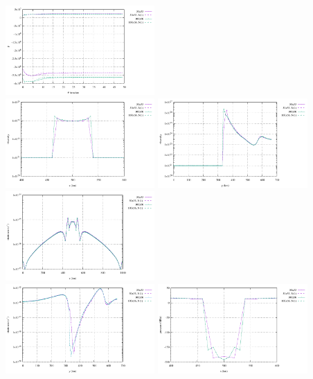 \begin{center}
\includegraphics[width=5.7cm]{python_codes/fieldstone_87/results/experiment_03/p}\\
\includegraphics[width=5.7cm]{python_codes/fieldstone_87/results/experiment_03/horizontal_profile_eta.pdf}
\includegraphics[width=5.7cm]{python_codes/fieldstone_87/results/experiment_03/vertical_profile_eta.pdf}
\includegraphics[width=5.7cm]{python_codes/fieldstone_87/results/experiment_03/horizontal_profile_srn.pdf}\\
\includegraphics[width=5.7cm]{python_codes/fieldstone_87/results/experiment_03/vertical_profile_srn.pdf}
\includegraphics[width=5.7cm]{python_codes/fieldstone_87/results/experiment_03/horizontal_profile_p.pdf}

\end{center}
